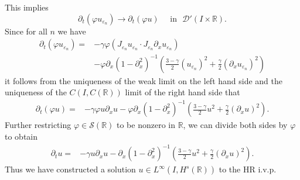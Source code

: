 \documentclass{beamer}
\newcommand{\rr}{\mathbb{R}}
\newcommand{\p}{\partial}
\newcommand{\ee}{\varepsilon}
\newcommand{\vp}{\varphi}
\begin{document}
    \begin{frame}
		This implies 
		\begin{equation}
			\label{hhdistib-conv-2}
			\p_t(\vp u_{\ee_n})  \longrightarrow  \p_t (\vp u)
			\quad
			\text{ in }  \,\, \mathcal{D}'(I\times \rr).
		\end{equation}
		Since for all $n$ we have 
		\begin{equation}
			\begin{split}
			 \p_t (\vp u_{\ee_n})
			 = & -\gamma \vp
			(J_{\varepsilon_n} u_{\varepsilon_n}  \cdot
			J_{\varepsilon_n}\partial_x u_{\varepsilon_n})
			\\
			& -
			\vp \p_x(1- \p_x^2)^{-1} \left( \frac{3-\gamma}{2} (u_{\ee_n})^2
			 + \frac{\gamma}{2} (\p_x u_{\ee_n})^2 \right )
		 \end{split}
		\end{equation}
		it follows from the uniqueness of the weak limit on the left hand side
    and the uniqueness of the
		$C(I, C(\rr))$ limit of the right hand side that 
		\begin{equation}
			\begin{split}
			 \p_t (\vp u)
			 = & -\gamma \vp
			u \p_x u - \vp \p_x(1- \p_x^2)^{-1} \left( \frac{3-\gamma}{2} u^2
			 + \frac{\gamma}{2} (\p_x u)^2 \right ).
			\label{hhadone}
			\end{split}
		\end{equation}
		Further restricting $\vp \in \mathcal{S}(\rr)$ to be nonzero in
		$\rr$, we
		can divide both sides by $\vp$ to obtain
		\begin{equation}
			\label{hh2yy}
			\begin{split}
			 \p_t  u
			 = & -\gamma
			u \p_x u - \p_x(1- \p_x^2)^{-1} \left( \frac{3-\gamma}{2} u^2
			 + \frac{\gamma}{2} (\p_x u)^2 \right ).
			\end{split}
		\end{equation}
		Thus we have constructed a solution $u \in L^\infty(I, H^s(\rr))$
		to the HR i.v.p. 
		\vskip0.1in

%
%

\end{frame}
%
%
%
%
%

\end{document}
